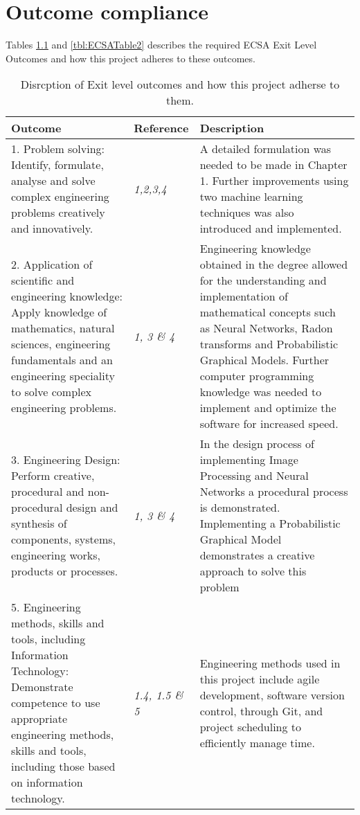 \chapter{Outcome compliance}
\label{ap:outCompliance}
\graphicspath{{Appendix2/Appendix2figures/}}
Tables \ref{tbl:ECSATable1} and \ref{tbl:ECSATable2} describes the required ECSA Exit Level Outcomes and how this project adheres to these outcomes.
\begin{table}
\caption{Disrcption of Exit level outcomes and how this project adherse to them.} \label{tbl:ECSATable1}
\begin{tabular}{|p{6cm}|p{3cm}|p{6cm}|}
\hline
\textbf{Outcome}&\textbf{Reference}&\textbf{Description}\\
\hline
1. Problem solving: Identify, formulate, analyse and solve complex engineering problems creatively and innovatively. & \textit{1,2,3,4} & A detailed formulation was needed to be made in Chapter 1. Further improvements using two machine learning techniques was also introduced and implemented.\\
\hline
2. Application of scientific and engineering knowledge: Apply knowledge of mathematics, natural sciences,
engineering fundamentals and an engineering speciality to solve complex engineering problems. & \textit{1, 3 \& 4} & Engineering knowledge obtained in the degree allowed for the understanding and implementation of mathematical concepts such as Neural Networks, Radon transforms and Probabilistic Graphical Models. Further computer programming knowledge was needed to implement and optimize the software for increased speed.\\
\hline
3. Engineering Design: Perform creative, procedural and non-procedural design and synthesis of components, systems,
engineering works, products or processes. & \textit{1, 3 \& 4} & In the design process of implementing Image Processing and Neural Networks a procedural process is demonstrated. Implementing a Probabilistic Graphical Model demonstrates a creative approach to solve this problem\\
\hline
5. Engineering methods, skills and tools, including Information Technology: Demonstrate competence to use
appropriate engineering methods, skills and tools, including those based on information technology. &\textit{1.4, 1.5 \& 5}  & Engineering methods used in this project include agile development, software version control, through Git, and project scheduling to efficiently manage time.        \\
\hline
\end{tabular}
\end{table}
